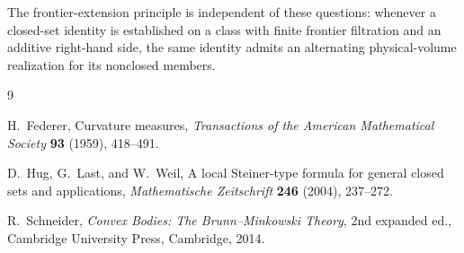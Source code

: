 \documentclass[11pt]{article}
\numberwithin{equation}{section}
\begin{document}
The frontier-extension principle is independent of these questions: whenever a closed-set identity is established on a class with finite frontier filtration and an additive right-hand side, the same identity admits an alternating physical-volume realization for its nonclosed members.
 \begin{thebibliography}{9}

H.~Federer,
\newblock Curvature measures,
\newblock \emph{Transactions of the American Mathematical Society} \textbf{93} (1959), 418--491.

D.~Hug, G.~Last, and W.~Weil,
\newblock A local Steiner-type formula for general closed sets and applications,
\newblock \emph{Mathematische Zeitschrift} \textbf{246} (2004), 237--272.

R.~Schneider,
\newblock \emph{Convex Bodies: The Brunn--Minkowski Theory},
\newblock 2nd expanded ed., Cambridge University Press, Cambridge, 2014.

\end{thebibliography}
 
\end{document}
